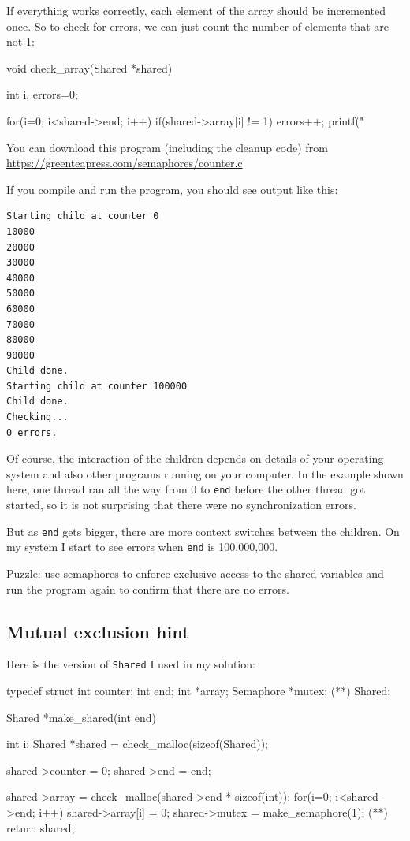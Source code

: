 \documentclass{book}
\begin{document}
If everything works correctly, each element of the array should be
incremented once.  So to check for errors, we can just count the
number of elements that are not 1:


\begin{unbreakable}[title={}]{}
void check_array(Shared *shared) {
  int i, errors=0;

  for(i=0; i<shared->end; i++) {
    if(shared->array[i] != 1) errors++;
  }
  printf("%
}
\end{unbreakable}

You can download this program (including the cleanup code) from
\url{https://greenteapress.com/semaphores/counter.c}

If you compile and run the program, you should see output like this:

\begin{verbatim}
Starting child at counter 0
10000
20000
30000
40000
50000
60000
70000
80000
90000
Child done.
Starting child at counter 100000
Child done.
Checking...
0 errors.
\end{verbatim}

Of course, the interaction of the children depends on details
of your operating system and also other programs running on your
computer.  In the example shown here, one thread ran all the way
from 0 to {\tt end} before the other thread got started, so it is
not surprising that there were no synchronization errors.

But as {\tt end} gets bigger, there are more context switches between
the children.  On my system I start to see errors when
    {\tt end} is 100,000,000.

Puzzle: use semaphores to enforce exclusive access to the shared
variables and run the program again to confirm that there are
no errors.


\subsection{Mutual exclusion hint}

Here is the version of {\tt Shared} I used in my solution:


\begin{unbreakable}[title={}]{}
typedef struct {
  int counter;
  int end;
  int *array;
  Semaphore *mutex;  (*\label{declaremutex}*)
} Shared;

Shared *make_shared(int end) {
 int i;
 Shared *shared = 
  check_malloc(sizeof(Shared));

 shared->counter = 0;
 shared->end = end;

 shared->array = 
  check_malloc(shared->end * sizeof(int));
 for(i=0; i<shared->end; i++) {
   shared->array[i] = 0;
 }
 shared->mutex = make_semaphore(1);  (*\label{initmutex}*)
 return shared;
}
\end{unbreakable}
\end{document}
